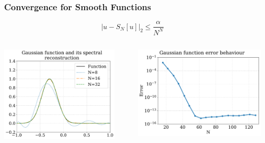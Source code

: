 \documentclass[9pt,usepdftitle=false,aspectratio=169]{beamer}
\newcommand{\norm}[1]{\left| #1 \right|_2}
\begin{document}
\begin{frame}
  \frametitle{Convergence for Smooth Functions}
  \begin{Large}
  \begin{displaymath}
    \norm{u - S_N[u]} \leq \frac{\alpha}{N^{N}}
  \end{displaymath}
  \end{Large}
  \begin{columns}
    \begin{column}{0.5\textwidth}
      \begin{center}
        \includegraphics[width=0.9\textwidth]{nogibbs}
      \end{center}
    \end{column}
    \begin{column}{0.5\textwidth}
      \begin{center}
        \includegraphics[width=\textwidth]{gaussian_error}
      \end{center}
    \end{column}
  \end{columns}
\end{frame}
\end{document}
